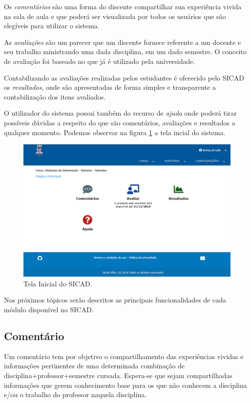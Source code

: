 \documentclass[12pt, a4paper]{report}
\begin{document}
Os \textit{comentários} são uma forma do discente compartilhar sua experiência vivida na sala de aula e que poderá ser visualizada por todos os usuários que são elegíveis para utilizar o sistema.

As \textit{avaliações} são um parecer que um discente fornece referente a um docente e seu trabalho ministrando uma dada disciplina, em um dado semestre. O conceito de avaliação foi baseado no que já é utilizado pela universidade.

Contabilizando as avaliações realizadas pelos estudantes é oferecido pelo \ac{SICAD} os \textit{resultados}, onde são apresentadas de forma simples e transparente a contabilização dos itens avaliados.

O utilizador do sistema possui também do recurso de \textit{ajuda} onde poderá tirar possíveis dúvidas a respeito do que são comentários, avaliações e resultados a qualquer momento. Podemos observar na figura \ref{fig:home_administrador} a tela incial do sistema.
\begin{figure}
\centering
\includegraphics[scale=0.5]{home_administrador.png}
\caption{Tela Inicial do SICAD.}
\label{fig:home_administrador}
\end{figure}

Nos próximos tópicos serão descritos as principais funcionalidades de cada módulo disponível no \ac{SICAD}.

\subsection{Comentário}
\label{subsec:comentario}
Um comentário tem por objetivo o compartilhamento das experiências vividas e informações pertinentes de uma determinada combinação de disciplina+professor+semestre cursada. Espera-se que sejam compartilhadas informações que gerem conhecimento base para os que não conhecem a disciplina e/ou o trabalho do professor naquela disciplina.
\end{document}
